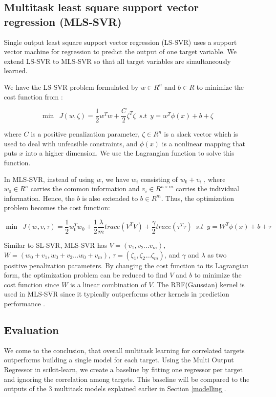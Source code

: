 \documentclass{article}
\begin{document}
\subsection{Multitask least square support vector regression (MLS-SVR)}

Single output least square support vector regression (LS-SVR) uses a support vector machine for regression to predict the output of one target variable. We extend LS-SVR to MLS-SVR so that  all target variables are simultaneously learned.

We have the LS-SVR problem formulated by $w\in R^{n}$  and $b\in R$ to minimize the cost function from \citet{xu_multi-output_2013}:

$$\min\enspace J(w,\zeta) = \frac{1}{2}w^{T}w+\frac{C}{2}\zeta^{T}\zeta\enspace s.t\enspace y=w^{T}\phi(x)+b+\zeta$$

where $C$ is a positive penalization parameter, $\zeta \in R^{n}$ is a slack vector which is used to deal with unfeasible constraints, and $\phi(x)$ is a nonlinear mapping that puts $x$ into a higher dimension. We use the Lagrangian function to solve this function.

In MLS-SVR, instead of using $w$, we have $w_{i}$ consisting of $w_{0}+v_{i}$ , where $w_{0}\in R^{n}$ carries the common information and $v_{i}\in R^{n\times m}$ carries the individual information. Hence, the $b$ is also extended to $b\in R^{m}$. Thus, the optimization problem becomes the cost function:

$$\min\enspace J(w,v,\tau) = \frac{1}{2}w_{0}^{T}w_{0}+\frac{1}{2}\frac{\lambda}{m}trace(V^{T}V)+\frac{\gamma}{2}trace(\tau^{T}\tau)\enspace
s.t\enspace y=W^{T}\phi(x)+b+\tau$$

Similar to SL-SVR,  MLS-SVR has $V=(v_{1},v_{2}...v_{m})$, $W=(w_{0}+v_{1},w_{0}+v_{2}...w_{0}+v_{m})$, $\tau=(\zeta_{1},\zeta_{2}...\zeta_{m})$, and $\gamma$ and $\lambda$ as two positive penalization parameters. By changing the cost function to its Lagrangian form, the optimization problem can be reduced to find $V$ and $b$ to minimize the cost function since $W$ is a linear combination of $V$. The RBF(Gaussian) kernel is used in MLS-SVR since it typically outperforms other kernels in prediction performance \citep{xu_multi-output_2013}.

\subsection{Evaluation}

We come to the conclusion, that overall multitask learning for correlated targets outperforms building a single model for each target. Using the Multi Output Regressor in scikit-learn, we create a baseline by fitting one regressor per target and ignoring the correlation among targets. This baseline will be compared to the outputs of the 3 multitask models explained earlier in Section \ref{modelling}.
\end{document}
